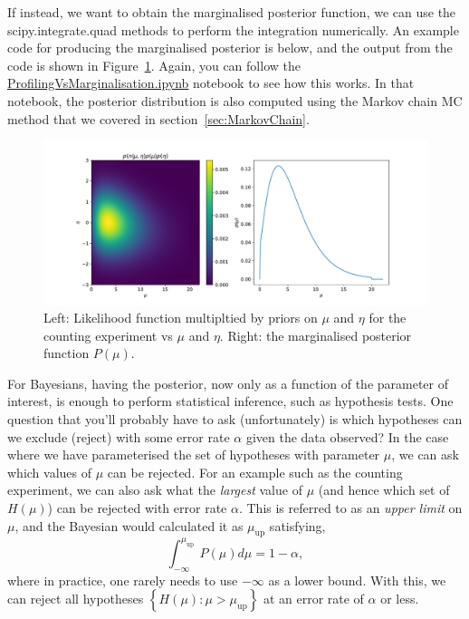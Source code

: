 If instead, we want to obtain the marginalised posterior function, 
we can use the \textsf{scipy.integrate.quad} methods 
to perform the integration numerically. An example code for 
producing the marginalised posterior is below, and the output 
from the code is shown in Figure~\ref{fig:marginalised_ex_counting}. 
Again, you can follow the 
\href{https://github.com/nucleosynthesis/PGStatistics/blob/main/notebooks/ProfilingVsMarginalisation.ipynb}{\textsf{ProfilingVsMarginalisation.ipynb}} 
notebook to see how this works. In that notebook, the posterior distribution is also computed 
using the Markov chain MC method that we covered in section~\ref{sec:MarkovChain}. 


\begin{figure}[hbt!]
    \centering
    \includegraphics[width=\textwidth]{figures/Hypotest/marginalised_lh_ex.pdf}
    \caption{Left: Likelihood function multipltied by priors on $\mu$ and $\eta$ for the counting experiment vs $\mu$ and $\eta$.  Right: the marginalised posterior function $P(\mu)$.}
    \label{fig:marginalised_ex_counting}
\end{figure}

For Bayesians, having the posterior, now only as a function of the parameter of interest, is enough to perform statistical inference, such as hypothesis tests. One question that you'll probably have to ask (unfortunately) is which hypotheses can we exclude (reject) with some error rate $\alpha$ given the data observed? In the case where we have parameterised the set of hypotheses with parameter $\mu$, we can ask which values of $\mu$ can be rejected. For an example such as the counting experiment, we can also ask what the \emph{largest} value of $\mu$ (and hence which set of $H(\mu)$) can be rejected with error rate $\alpha$. This is referred to as an \emph{upper limit} on $\mu$, and the Bayesian would calculated it as $\mu_{\mathrm{up}}$ satisfying, 
\begin{equation}
    \int_{-\infty}^{\mu_{\mathrm{up}}}P(\mu)d\mu = 1-\alpha,
\end{equation}
where in practice, one rarely needs to use $-\infty$ as a lower bound. With this, we can reject all hypotheses $\left\{H(\mu):\mu>\mu_{\mathrm{up}}\right\}$ at an error rate of $\alpha$ or less. 

